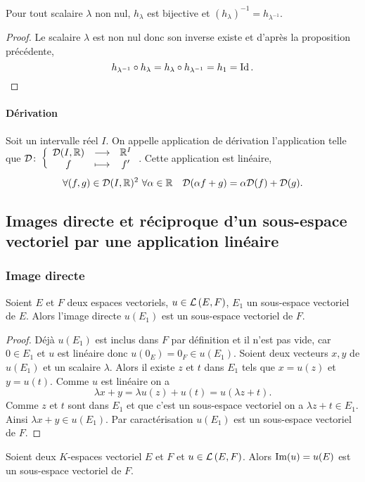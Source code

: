 \begin{prop}
  Pour tout scalaire \(\lambda\) non nul, \(h_\lambda\) est bijective et 
  \((h_\lambda)^{-1}=h_{\lambda^{-1}}\).
\end{prop}
\begin{proof}
  Le scalaire \(\lambda\) est non nul donc son inverse existe et d'après la 
  proposition précédente,
  \begin{equation}
    h_{\lambda^{-1}} \circ h_\lambda = h_\lambda \circ h_{\lambda^{-1}} = 
    h_1=\operatorname{Id}.
  \end{equation}
\end{proof}

\paragraph{Dérivation}
Soit un intervalle réel \(I\). On appelle application de dérivation 
l'application telle que \(\mathcal{D}\colon \left\{\begin{array}{ccc} \mathcal{D}(I,\mathbb{R}) & \longrightarrow &\mathbb{R}^I\\ f & \longmapsto & f' \end{array} \right.\). Cette 
application est linéaire,
\begin{equation}
  \forall (f,g) \in \mathcal{D}(I,\mathbb{R})^2 \ \forall \alpha \in \mathbb{R} \quad \mathcal{D}(\alpha 
  f+g)= \alpha \mathcal{D}(f)+\mathcal{D}(g).
\end{equation}

\subsection{Images directe et réciproque d'un sous-espace vectoriel par une 
application linéaire}

\subsubsection{Image directe}

\begin{theo}
  Soient \(E\) et \(F\) deux espaces vectoriels, \(u \in \mathcal{L}\left(E,F\right)\), \(E_1\) 
  un sous-espace vectoriel de \(E\). Alors l'image directe \(u(E_1)\) est un 
  sous-espace vectoriel de \(F\).
\end{theo}

\begin{proof}
  Déjà \(u(E_1)\) est inclus dans \(F\) par définition et il n'est pas vide, car 
  \(0 \in E_1\) et \(u\) est linéaire donc \(u(0_E)=0_F \in u(E_1)\). Soient 
  deux vecteurs \(x,y\) de \(u(E_1)\) et un scalaire \(\lambda\). Alors il 
  existe \(z\) et \(t\) dans \(E_1\) tels que \(x=u(z)\) et \(y=u(t)\). Comme 
  \(u\) est linéaire on a
  \begin{equation}
    \lambda x +y = \lambda u(z)+u(t)=u(\lambda z+t).
  \end{equation}
  Comme \(z\) et \(t\) sont dans \(E_1\) et que c'est un sous-espace vectoriel 
  on a \(\lambda z +t \in E_1\). Ainsi \(\lambda x + y \in u(E_1)\). Par 
  caractérisation \(u(E_1)\) est un sous-espace vectoriel de \(F\).
\end{proof}
%
\begin{corth}
  Soient deux \(K\)-espaces vectoriel \(E\) et \(F\) et \(u \in \mathcal{L}\left(E,F\right)\). 
  Alors \(\operatorname{Im}(u)=u(E)\) est un sous-espace vectoriel de \(F\).
\end{corth}

